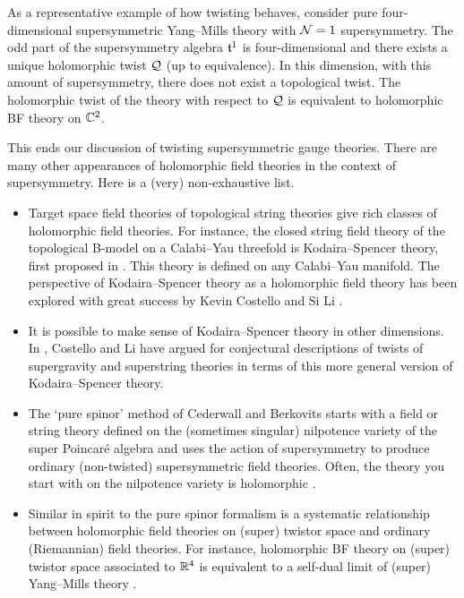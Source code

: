 \documentclass[11pt]{amsart}
\begin{document}
As a representative example of how twisting behaves, 
consider pure four-dimensional supersymmetric Yang--Mills theory with $\mathcal N=1$ supersymmetry.
The odd part of the supersymmetry algebra $\mathfrak t^1$ is four-dimensional and there exists a unique holomorphic twist $\mathcal Q$ (up to equivalence).
In this dimension, with this amount of supersymmetry, there does not exist a topological twist.
The holomorphic twist of the theory with respect to $\mathcal Q$ is equivalent to holomorphic BF theory on $\mathbb C^2$.

This ends our discussion of twisting supersymmetric gauge theories.
There are many other appearances of holomorphic field theories in the context of supersymmetry.
Here is a (very) non-exhaustive list.

\begin{itemize}
\item Target space field theories of topological string theories give rich classes of holomorphic field theories. 
For instance, the closed string field theory of the topological B-model on a Calabi--Yau threefold is Kodaira--Spencer theory, first proposed in \cite{BCOV}. 
This theory is defined on any Calabi--Yau manifold. 
The perspective of Kodaira--Spencer theory as a holomorphic field theory has been explored with great success by Kevin Costello and Si Li \cite{CL1, CL2, CL3}.
\item
It is possible to make sense of Kodaira--Spencer theory in other dimensions.
In \cite{CLsugra}, Costello and Li have argued for conjectural descriptions of twists of supergravity and superstring theories in terms of this more general version of Kodaira--Spencer theory.
\item The `pure spinor' method of Cederwall and Berkovits \cite{Cederwall, Berkovits} starts with a field or string theory defined on the (sometimes singular) nilpotence variety of the super Poincar\'e algebra and uses the action of supersymmetry to produce ordinary (non-twisted) supersymmetric field theories. 
Often, the theory you start with on the nilpotence variety is holomorphic \cite{ESW,SWpure}. 
\item Similar in spirit to the pure spinor formalism is a systematic relationship between holomorphic field theories on (super) twistor space and ordinary (Riemannian) field theories.
For instance, holomorphic BF theory on (super) twistor space associated to $\mathbb R^4$ is equivalent to a self-dual limit of (super) Yang--Mills theory \cite{Penrose, Kevins work..., other twistor literature}.
\end{itemize}
\end{document}
